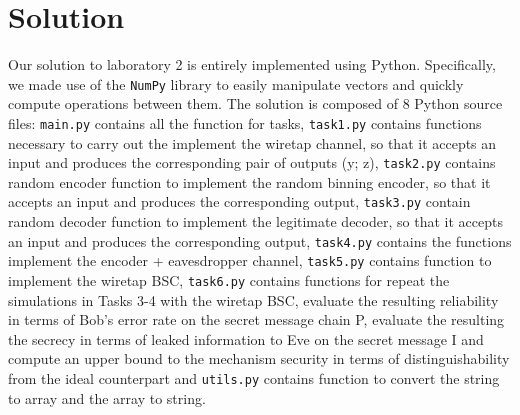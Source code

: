 \documentclass{report}
\begin{document}
\chapter*{Solution}
Our solution to laboratory 2 is entirely implemented using Python. Specifically, we made use of the {\tt NumPy} library to easily manipulate vectors and quickly compute operations between them. The solution is composed of 8 Python source files: {\tt main.py} contains all the function for tasks, {\tt task1.py} contains functions necessary to carry out the implement the wiretap channel, so that it accepts an
input  and produces the corresponding pair of outputs (y; z), {\tt task2.py} contains random encoder function to implement the random binning encoder, so that it accepts an input and produces the corresponding output, {\tt task3.py} contain random decoder function to implement the legitimate decoder, so that it accepts an input and produces the corresponding output,  {\tt task4.py} contains the functions implement the encoder + eavesdropper channel, {\tt task5.py}  contains function to implement the wiretap BSC, {\tt task6.py} contains functions for repeat the simulations in Tasks 3-4 with the wiretap BSC, evaluate the resulting reliability in terms of Bob's error rate on the secret message chain P, evaluate the resulting the secrecy in terms of leaked information to Eve on the secret message I and compute an upper bound to the mechanism security in terms of distinguishability from the ideal
counterpart and {\tt utils.py} contains function to convert the string to array and the array to string. 
\end{document}
